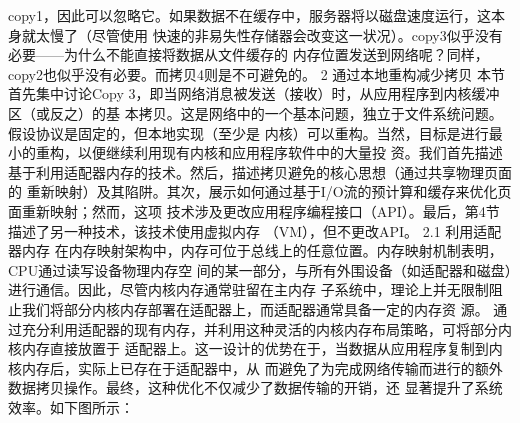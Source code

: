 copy1，因此可以忽略它。如果数据不在缓存中，服务器将以磁盘速度运行，这本身就太慢了（尽管使用
快速的非易失性存储器会改变这一状况）。copy3似乎没有必要——为什么不能直接将数据从文件缓存的
内存位置发送到网络呢？同样，copy2也似乎没有必要。而拷贝4则是不可避免的。
2 通过本地重构减少拷贝
本节首先集中讨论Copy 3，即当网络消息被发送（接收）时，从应用程序到内核缓冲区（或反之）的基
本拷贝。这是网络中的一个基本问题，独立于文件系统问题。假设协议是固定的，但本地实现（至少是
内核）可以重构。当然，目标是进行最小的重构，以便继续利用现有内核和应用程序软件中的大量投
资。我们首先描述基于利用适配器内存的技术。然后，描述拷贝避免的核心思想（通过共享物理页面的
重新映射）及其陷阱。其次，展示如何通过基于I/O流的预计算和缓存来优化页面重新映射；然而，这项
技术涉及更改应用程序编程接口（API）。最后，第4节描述了另一种技术，该技术使用虚拟内存
（VM），但不更改API。
2.1 利用适配器内存
在内存映射架构中，内存可位于总线上的任意位置。内存映射机制表明，CPU通过读写设备物理内存空
间的某一部分，与所有外围设备（如适配器和磁盘）进行通信。因此，尽管内核内存通常驻留在主内存
子系统中，理论上并无限制阻止我们将部分内核内存部署在适配器上，而适配器通常具备一定的内存资
源。
通过充分利用适配器的现有内存，并利用这种灵活的内核内存布局策略，可将部分内核内存直接放置于
适配器上。这一设计的优势在于，当数据从应用程序复制到内核内存后，实际上已存在于适配器中，从
而避免了为完成网络传输而进行的额外数据拷贝操作。最终，这种优化不仅减少了数据传输的开销，还
显著提升了系统效率。如下图所示：




